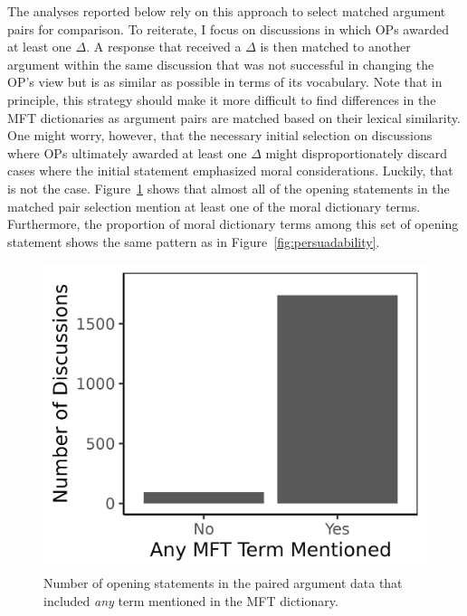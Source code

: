 The analyses reported below rely on this approach to select matched argument pairs for comparison. To reiterate, I focus on discussions in which OPs awarded at least one $\Delta$. A response that received a $\Delta$ is then matched to another argument within the same discussion that was not successful in changing the OP's view but is as similar as possible in terms of its vocabulary. Note that in principle, this strategy should make it more difficult to find differences in the MFT dictionaries as argument pairs are matched based on their lexical similarity. One might worry, however, that the necessary initial selection on discussions where OPs ultimately awarded at least one $\Delta$ might disproportionately discard cases where the initial statement emphasized moral considerations. Luckily, that is not the case. Figure~\ref{fig:mft_op_all} shows that almost all of the opening statements in the matched pair selection mention at least one of the moral dictionary terms. Furthermore, the proportion of moral dictionary terms among this set of opening statement shows the same pattern as in Figure~\ref{fig:persuadability}.

\begin{figure}[ht]
\centering
\includegraphics{fig4-mft_op_all_political.png}
\caption[Number of opening statements in the paired argument data that included \textit{any} term mentioned in the MFT dictionary]{Number of opening statements in the paired argument data that included \textit{any} term mentioned in the MFT dictionary.}\label{fig:mft_op_all}
\end{figure}

